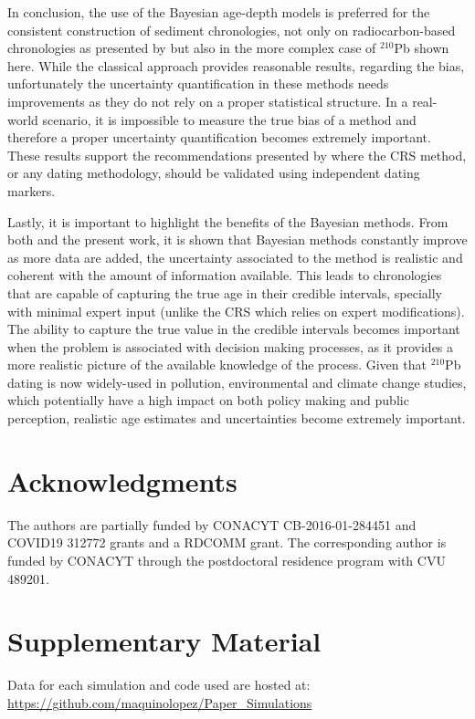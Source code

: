 \documentclass [10pt] {article}
\begin{document}
In conclusion, the use of the Bayesian age-depth models is preferred for the consistent construction of sediment chronologies, not only on radiocarbon-based chronologies as presented by \citet{Blaauw2018} but also in the more complex case of $^{210}$Pb shown here.
While the classical approach provides reasonable results, regarding the bias, unfortunately the uncertainty quantification in these methods needs improvements as they do not rely on a proper statistical structure. 
In a real-world scenario, it is impossible to measure the true bias of a method and therefore a proper uncertainty quantification becomes extremely important.
These results support the recommendations presented by \citet{Smith2001,Barsanti2020} where the CRS method, or any dating methodology, should be validated using independent dating markers. 

Lastly, it is important to highlight the benefits of the Bayesian methods.
From both \citet{Blaauw2018} and the present work, it is shown that Bayesian methods constantly improve as more data are added, the uncertainty associated to the method is realistic and coherent with the amount of information available. 
This leads to chronologies that are capable of capturing the true age in their credible intervals, specially with minimal expert input (unlike the CRS which relies on expert modifications). 
The ability to capture the true value in the credible intervals becomes important when the problem is associated with decision making processes, as it provides a more realistic picture of the available knowledge of the process. 
Given that $^{210}$Pb dating is now widely-used in pollution, environmental and climate change studies, which potentially have a high impact on both policy making and public perception, realistic age estimates and uncertainties become extremely important. 



\section{Acknowledgments}

The authors are partially funded by CONACYT CB-2016-01-284451 and COVID19 312772 grants and a RDCOMM grant.
The corresponding author is funded by CONACYT through the postdoctoral residence program with CVU  489201.




\newpage




\section{Supplementary Material}
\label{sec:supp_mat}
Data for each simulation and code used are hosted at: \url{https://github.com/maquinolopez/Paper_Simulations}
\end{document}
